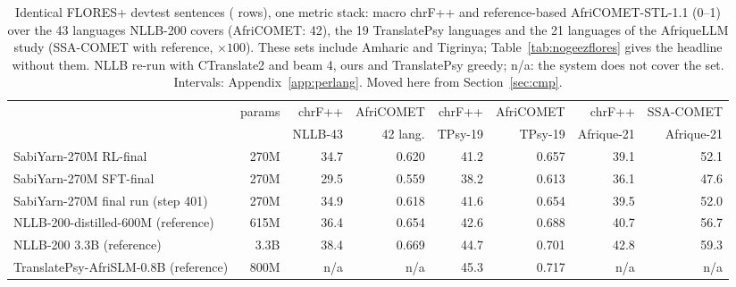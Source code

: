 \begin{table}[t]
\centering\small\setlength{\tabcolsep}{4pt}
\begin{tabular}{@{}lrrrrrrr@{}}
\toprule
 & params & chrF++ & AfriCOMET & chrF++ & AfriCOMET & chrF++ & SSA-COMET \\
 & & NLLB-43 & 42 lang. & TPsy-19 & TPsy-19 & Afrique-21 & Afrique-21 \\
\midrule
SabiYarn-270M RL-final & 270M & 34.7 & 0.620 & 41.2 & 0.657 & 39.1 & 52.1 \\
SabiYarn-270M SFT-final & 270M & 29.5 & 0.559 & 38.2 & 0.613 & 36.1 & 47.6 \\
SabiYarn-270M final run (step 401) & 270M & 34.9 & 0.618 & 41.6 & 0.654 & 39.5 & 52.0 \\
\midrule
NLLB-200-distilled-600M (reference) & 615M & 36.4 & 0.654 & 42.6 & 0.688 & 40.7 & 56.7 \\
NLLB-200 3.3B (reference) & 3.3B & 38.4 & 0.669 & 44.7 & 0.701 & 42.8 & 59.3 \\
TranslatePsy-AfriSLM-0.8B (reference) & 800M & n/a & n/a & 45.3 & 0.717 & n/a & n/a \\
\bottomrule
\end{tabular}
\caption{Identical FLORES+ devtest sentences (\nopair{} rows), one metric stack: macro chrF++ and reference-based AfriCOMET-STL-1.1 (0--1) over the 43 languages NLLB-200 covers (AfriCOMET: 42), the 19 TranslatePsy languages and the 21 languages of the AfriqueLLM study (SSA-COMET with reference, $\times100$). These sets include Amharic and Tigrinya; Table~\ref{tab:nogeezflores} gives the headline without them. NLLB re-run with CTranslate2 and beam 4, ours and TranslatePsy greedy; n/a: the system does not cover the set. Intervals: Appendix~\ref{app:perlang}. Moved here from Section~\ref{sec:cmp}.}
\label{tab:cmp}
\end{table}
